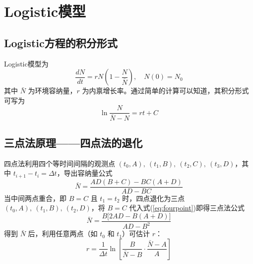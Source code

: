 \section{Logistic模型}
\subsection{Logistic方程的积分形式}
Logistic模型为
\begin{equation}
    \frac{dN}{dt}=rN\left(1-\frac{N}{\bar{N}}\right),\quad N(0)=N_0
\end{equation}
其中 $\bar{N}$ 为环境容纳量，$r$ 为内禀增长率。通过简单的计算可以知道，其积分形式可写为
\begin{equation}
    \ln\frac{N}{\bar{N}-N}=rt+C
    \label{eq:logistic_linear}
\end{equation}

\subsection{三点法原理——四点法的退化}
四点法利用四个等时间间隔的观测点 $(t_0,A),\ (t_1,B),\ (t_2,C),\ (t_3,D)$，其中 $t_{i+1}-t_i=\Delta t$，导出容纳量公式
\begin{equation}
    \bar{N}=\frac{AD(B+C)-BC(A+D)}{AD-BC}
    \label{eq:fourpoint}
\end{equation}
当中间两点重合，即 $B=C$ 且 $t_1=t_2$ 时，四点退化为三点 $(t_0,A),\ (t_1,B),\ (t_2,D)$，将 $B=C$ 代入式(\ref{eq:fourpoint})即得三点法公式
\begin{equation}
    \boxed{\bar{N}=\frac{B\bigl[2AD-B(A+D)\bigr]}{AD-B^2}}
    \label{eq:threepoint}
\end{equation}
得到 $\bar{N}$ 后，利用任意两点（如 $t_0$ 和 $t_1$）可估计 $r$：
\begin{equation}
    r=\frac{1}{\Delta t}\ln\left[\frac{B}{\bar{N}-B}\cdot\frac{\bar{N}-A}{A}\right]
    \label{eq:r_threepoint}
\end{equation}

